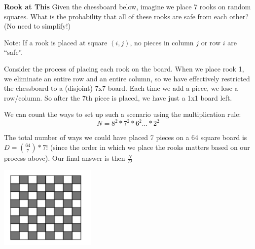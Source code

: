 \question \textbf{Rook at This}\newline
Given the chessboard below, imagine we place 7 rooks on random squares. What is the probability that all of these rooks are safe from each other? (No need to simplify!)

Note: If a rook is placed at square $(i,j)$, no pieces in column $j$ or row $i$ are “safe”. 
\begin{solution}
Consider the process of placing each rook on the board. When we place rook 1, we eliminate an entire row and an entire column, so we have effectively restricted the chessboard to a (disjoint) 7x7 board. Each time we add a piece, we lose a row/column. So after the 7th piece is placed, we have just a 1x1 board left. 

We can count the ways to set up such a scenario using the multiplication rule: 
\[N = 8^2 * 7^2 * 6^2 \dotsc * 2^2\]

The total number of ways we could have placed 7 pieces on a 64 square board is $D = {64 \choose 7} * 7!$ (since the order in which we place the rooks matters based on our process above). Our final answer is then $\frac{N}{D}$

\end{solution}

\begin{center}
\includegraphics{rook.jpg}
\end{center}